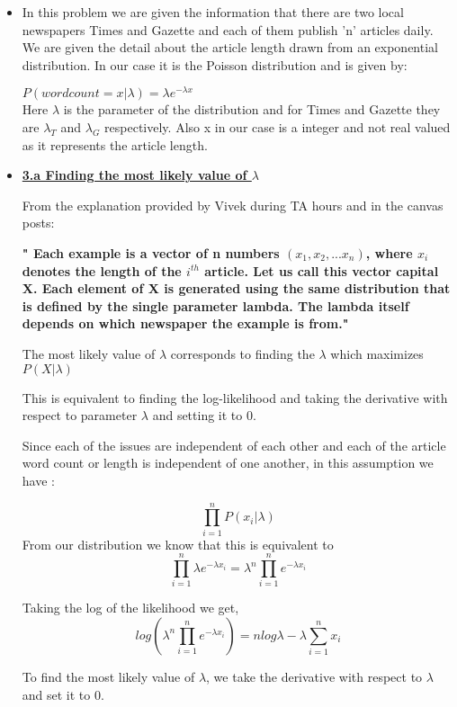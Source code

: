 \documentclass[11pt]{article}
\begin{document}
\begin{itemize}
	
	\item[]  In this problem we are given the information that there are two local newspapers Times and Gazette and each of them publish 'n' articles daily. We are given the detail about the article length drawn from an exponential distribution. In our case it is the Poisson distribution and is given by:
	
	$P(wordcount=x | \lambda) =\lambda e^{-\lambda x}$\\
	
	Here $\lambda$ is the parameter of the distribution and for Times and Gazette they are $\lambda_T$ and $\lambda_G$ respectively. Also x in our case is a integer and not real valued as it represents the article length.
	
	\item[] \textbf{\underline{3.a Finding the most likely value of $\lambda$ }}
	
	From the explanation provided by Vivek during TA hours and in the canvas posts:
	
	\textbf{ " Each example is a vector of n numbers $(x_1, x_2, ... x_n)$, where $x_i$ denotes the length of the $i^{th}$ article. Let us call this vector capital X. Each element of X is generated using the same distribution that is defined by the single parameter lambda. The lambda itself depends on which newspaper the example is from." }
	
	The most likely value of $\lambda$ corresponds to finding the $\lambda$ which maximizes $P(X|\lambda )$
	
	This is equivalent to finding the log-likelihood and taking the derivative with respect to parameter $\lambda$ and setting it to 0.
	
	Since each of the issues are independent of each other and each of the article word count or length is independent of one another, in this assumption  we have :
	
	$$\prod_{i=1}^{n} P(x_i | \lambda) $$ 
	From our distribution we know that this is equivalent to
	$$\prod_{i=1}^{n} \lambda e^{-\lambda x_i} = \lambda^ n \prod_{i=1}^{n} e^{- \lambda x_i} $$
	
	Taking the log of the likelihood we get,
	$$log( \lambda^n \prod_{i=1}^{n} e^{-\lambda x_i}) = n log \lambda  - \lambda \sum_{i=1}^{n} x_i $$
	
	To find the most likely value of $\lambda$, we take the derivative with respect to $\lambda$ and set it to 0.
	

\end{itemize}
\end{document}

